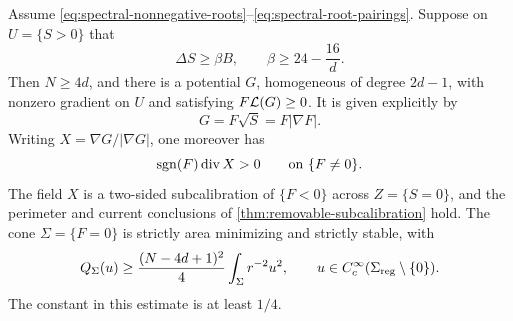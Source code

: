 \begin{theorem}
\label{thm:spectral-gradient-subcalibration}
Assume \eqref{eq:spectral-nonnegative-roots}--\eqref{eq:spectral-root-pairings}.
Suppose on \(U=\{S>0\}\) that
\begin{equation}\label{eq:spectral-threshold}
 \Delta S\ge\beta B,\qquad
 \beta\ge24-\frac{16}{d}.
\end{equation}
Then \(N\ge4d\), and there is a potential \(G\), homogeneous of
degree \(2d-1\),
with nonzero gradient on \(U\) and satisfying \(F\mathcal L(G)\ge0\).
It is given explicitly by
\begin{equation}\label{eq:spectral-gradient-potential}
 G=F\sqrt S=F|\nabla F|.
\end{equation}
Writing \(X=\nabla G/|\nabla G|\), one moreover has
\begin{equation}\label{eq:spectral-strict-divergence}
 \operatorname{sgn}(F)\operatorname{div} X>0
 \qquad\text{on }\{F\ne0\}.
\end{equation}
The field \(X\) is a two-sided subcalibration of \(\{F<0\}\)
across \(Z=\{S=0\}\), and the perimeter and current conclusions of
\cref{thm:removable-subcalibration} hold. The cone
\(\Sigma=\{F=0\}\) is strictly area minimizing and strictly
stable, with
\begin{equation}\label{eq:spectral-Hardy-gap}
 Q_\Sigma(u)\ge\frac{(N-4d+1)^2}{4}
       \int_\Sigma r^{-2}u^2,
 \qquad u\in C_c^\infty(\Sigma_{\mathrm{reg}}\setminus\{0\}).
\end{equation}
The constant in this estimate is at least \(1/4\).
\end{theorem}

